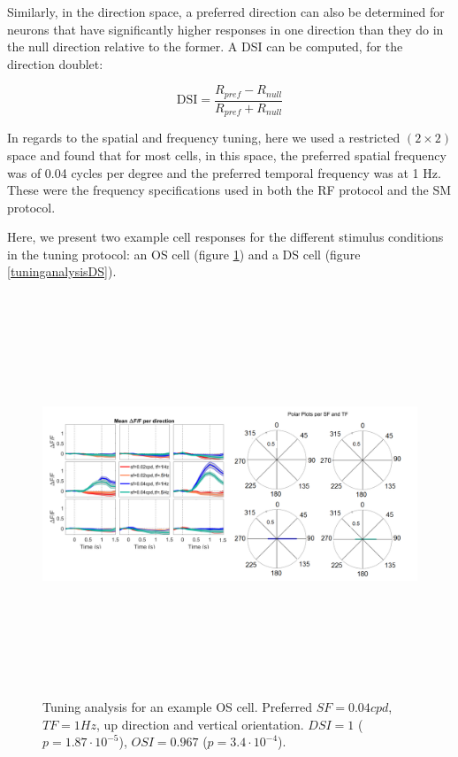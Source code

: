 Similarly, in the direction space, a preferred direction can also be determined for neurons that have significantly higher responses in one direction than they do in the null direction relative to the former. A DSI can be computed, for the direction doublet:

\begin{equation}
\text{DSI}=\dfrac{R_{pref} - R_{null}}{R_{pref} + R_{null}}
\end{equation}

In regards to the spatial and frequency tuning, here we used a restricted $(2 \times 2)$ space and found that for most cells, in this space, the preferred spatial frequency was of 0.04 cycles per degree and the preferred temporal frequency was at 1 Hz. These were the frequency specifications used in both the RF protocol and the SM protocol.

Here, we present two example cell responses for the different stimulus conditions in the tuning protocol: an OS cell (figure \ref{tuninganalysisOS}) and a DS cell (figure \ref{tuninganalysisDS}).

\begin{figure}[H] \centering \includegraphics[width=12cm,height=12cm,keepaspectratio]{Figures/7.Results/tuning/MF379_pos2_p3_ROI0051.png} 
\caption{Tuning analysis for an example OS cell. Preferred $SF=0.04 cpd$, $TF=1 Hz$, up direction and vertical orientation. $DSI=1$ ($p=1.87 \cdot 10^{-5}$), $OSI=0.967$ ($p=3.4 \cdot 10^{-4}$).}
\label{tuninganalysisOS}
\end{figure}

